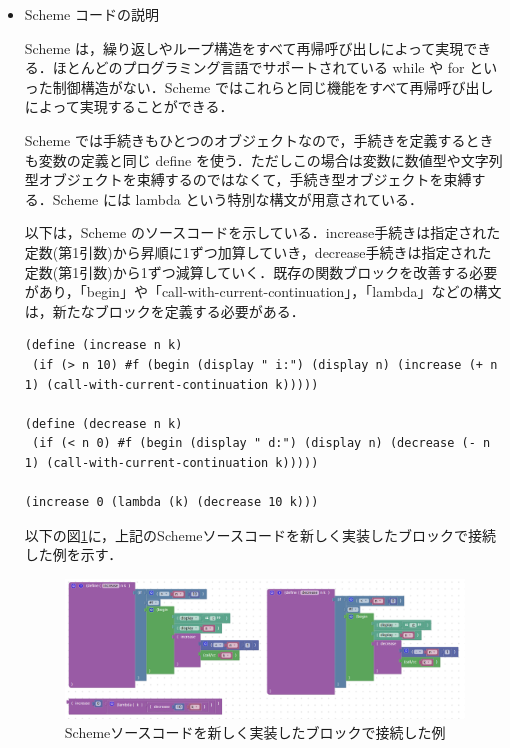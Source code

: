 \documentclass{risepaper}
\begin{document}
\begin{itemize}   

\item Scheme コードの説明

Scheme は，繰り返しやループ構造をすべて再帰呼び出しによって実現できる．ほとんどのプログラミング言語でサポートされている while や for といった制御構造がない．Scheme ではこれらと同じ機能をすべて再帰呼び出しによって実現することができる．

Scheme では手続きもひとつのオブジェクトなので，手続きを定義するときも変数の定義と同じ define を使う．ただしこの場合は変数に数値型や文字列型オブジェクトを束縛するのではなくて，手続き型オブジェクトを束縛する．Scheme には lambda という特別な構文が用意されている．

以下は，Scheme のソースコードを示している．increase手続きは指定された定数(第1引数)から昇順に1ずつ加算していき，decrease手続きは指定された定数(第1引数)から1ずつ減算していく．既存の関数ブロックを改善する必要があり，「begin」や「call-with-current-continuation」，「lambda」などの構文は，新たなブロックを定義する必要がある．

\begin{lstlisting}[basicstyle=\ttfamily\footnotesize]
(define (increase n k)
 (if (> n 10) #f (begin (display " i:") (display n) (increase (+ n 1) (call-with-current-continuation k)))))

(define (decrease n k)
 (if (< n 0) #f (begin (display " d:") (display n) (decrease (- n 1) (call-with-current-continuation k)))))

(increase 0 (lambda (k) (decrease 10 k)))
\end{lstlisting}

以下の図\ref{fig:scheme_blocks_example}に，上記のSchemeソースコードを新しく実装したブロックで接続した例を示す．

\begin{figure}[h]
\begin{center}
\includegraphics[scale=0.5]{img/scheme_blocks_example.PNG}
\caption{Schemeソースコードを新しく実装したブロックで接続した例}%
\label{fig:scheme_blocks_example}
\end{center}%
\end{figure}%



\end{itemize}
\end{document}
